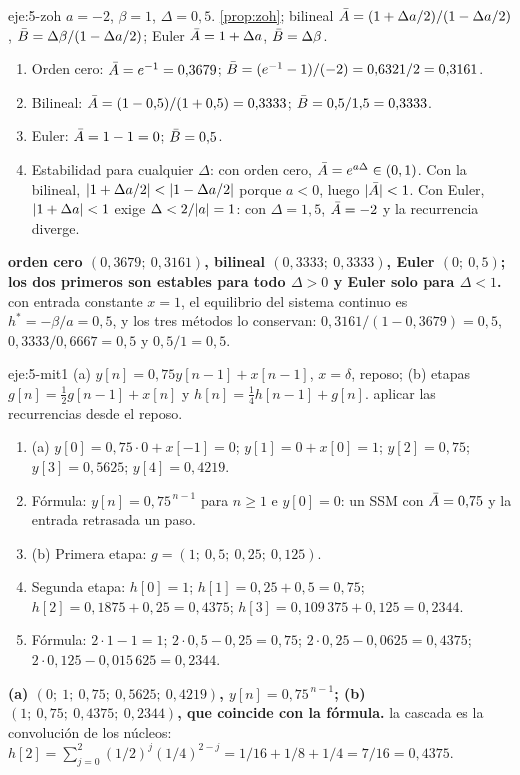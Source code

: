 \begin{solucion}{eje:5-zoh}
\datos $a=-2$, $\beta=1$, $\Delta=0{,}5$.
\planteamiento \cref{prop:zoh}; bilineal $\bar{A}=(1+\Delta a/2)/(1-\Delta a/2)$, $\bar{B}=\Delta\beta/(1-\Delta a/2)$; Euler $\bar{A}=1+\Delta a$, $\bar{B}=\Delta\beta$.
\pasos
\begin{enumerate}[label=\arabic*.]
  \item Orden cero: $\bar{A}=e^{-1}=0{,}3679$; $\bar{B}=(e^{-1}-1)/(-2)=0{,}6321/2=0{,}3161$.
  \item Bilineal: $\bar{A}=(1-0{,}5)/(1+0{,}5)=0{,}3333$; $\bar{B}=0{,}5/1{,}5=0{,}3333$.
  \item Euler: $\bar{A}=1-1=0$; $\bar{B}=0{,}5$.
  \item Estabilidad para cualquier $\Delta$: con orden cero, $\bar{A}=e^{a\Delta}\in(0,1)$. Con la bilineal, $\lvert1+\Delta a/2\rvert<\lvert1-\Delta a/2\rvert$ porque $a<0$, luego $\lvert\bar{A}\rvert<1$. Con Euler, $\lvert1+\Delta a\rvert<1$ exige $\Delta<2/\lvert a\rvert=1$: con $\Delta=1{,}5$, $\bar{A}=-2$ y la recurrencia diverge.
\end{enumerate}
\resultado \textbf{orden cero $(0{,}3679;\ 0{,}3161)$, bilineal $(0{,}3333;\ 0{,}3333)$, Euler $(0;\ 0{,}5)$; los dos primeros son estables para todo $\Delta>0$ y Euler solo para $\Delta<1$.}
\comprobacion con entrada constante $x=1$, el equilibrio del sistema continuo es $h^{\ast}=-\beta/a=0{,}5$, y los tres métodos lo conservan: $0{,}3161/(1-0{,}3679)=0{,}5$, $0{,}3333/0{,}6667=0{,}5$ y $0{,}5/1=0{,}5$.
\end{solucion}

\begin{solucion}{eje:5-mit1}
\datos (a) $y[n]=0{,}75y[n-1]+x[n-1]$, $x=\delta$, reposo; (b) etapas $g[n]=\frac12g[n-1]+x[n]$ y $h[n]=\frac14h[n-1]+g[n]$.
\planteamiento aplicar las recurrencias desde el reposo.
\pasos
\begin{enumerate}[label=\arabic*.]
  \item (a) $y[0]=0{,}75\cdot 0+x[-1]=0$; $y[1]=0+x[0]=1$; $y[2]=0{,}75$; $y[3]=0{,}5625$; $y[4]=0{,}4219$.
  \item Fórmula: $y[n]=0{,}75^{\,n-1}$ para $n\ge 1$ e $y[0]=0$: un SSM con $\bar{A}=0{,}75$ y la entrada retrasada un paso.
  \item (b) Primera etapa: $g=(1;\ 0{,}5;\ 0{,}25;\ 0{,}125)$.
  \item Segunda etapa: $h[0]=1$; $h[1]=0{,}25+0{,}5=0{,}75$; $h[2]=0{,}1875+0{,}25=0{,}4375$; $h[3]=0{,}109\,375+0{,}125=0{,}2344$.
  \item Fórmula: $2\cdot 1-1=1$; $2\cdot 0{,}5-0{,}25=0{,}75$; $2\cdot 0{,}25-0{,}0625=0{,}4375$; $2\cdot 0{,}125-0{,}015\,625=0{,}2344$.
\end{enumerate}
\resultado \textbf{(a) $(0;\ 1;\ 0{,}75;\ 0{,}5625;\ 0{,}4219)$, $y[n]=0{,}75^{\,n-1}$; (b) $(1;\ 0{,}75;\ 0{,}4375;\ 0{,}2344)$, que coincide con la fórmula.}
\comprobacion la cascada es la convolución de los núcleos: $h[2]=\sum_{j=0}^{2}(1/2)^{j}(1/4)^{2-j}=1/16+1/8+1/4=7/16=0{,}4375$.
\end{solucion}

